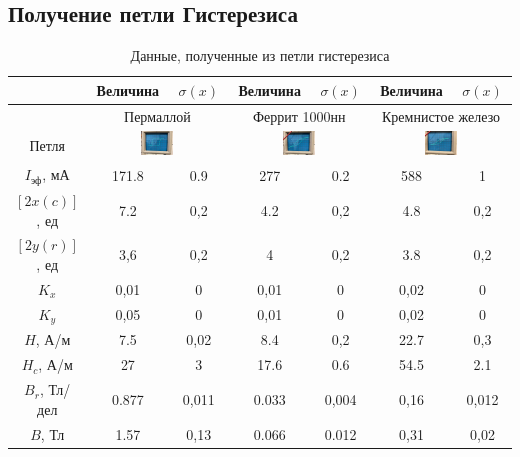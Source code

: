 \documentclass[a4paper, 12pt]{article}%
\begin{document}
	\subsection*{Получение петли Гистерезиса}
	\begin{table}[H]
		\centering
		\begin{tabular}{|c|c|c|c|c|c|c|}
			\hline
			& Величина & $\sigma (x)$ & Величина & $\sigma(x)$ & Величина & $\sigma(x)$ \\ \hline
			& \multicolumn{2}{c|}{Пермаллой} & \multicolumn{2}{c|}{Феррит 1000нн} & \multicolumn{2}{c|}{Кремнистое железо} \\ \hline
			Петля & \multicolumn{2}{c|}{\includegraphics[width = 0.25\textwidth]{пермаллой.jpg}} &  \multicolumn{2}{c|}{\includegraphics[width = 0.25\textwidth]{феррит.jpg}} &  \multicolumn{2}{c|}{\includegraphics[width = 0.25\textwidth]{кремнистое железо.jpg}} \\ \hline
			$I_{\text{эф}}$, мА & 171.8 & 0.9 & 277 & 0.2 & 588 & 1 \\ \hline
			$[2x(c)]$, ед & 7.2 & 0,2 & 4.2 & 0,2 & 4.8 & 0,2 \\ \hline
			$[2y(r)]$, ед & 3,6 & 0,2 & 4 & 0,2 & 3.8 & 0,2 \\ \hline
			$K_x$ & 0,01 & 0 & 0,01 & 0 & 0,02 & 0 \\ \hline
			$K_y$ & 0,05 & 0 & 0,01 & 0 & 0,02 & 0 \\ \hline
			$H$, А/м & 7.5 & 0,02 & 8.4 & 0,2 & 22.7 & 0,3 \\ \hline
			$H_c$, А/м & 27 & 3 & 17.6 & 0.6 & 54.5 & 2.1 \\ \hline
			$B_r$, Тл/дел & 0.877 & 0,011 & 0.033 & 0,004 & 0,16 & 0,012 \\ \hline
			$B$, Тл & 1.57 & 0,13 & 0.066 & 0.012 & 0,31 & 0,02 \\ \hline
		\end{tabular}\\
		\caption{Данные, полученные из петли гистерезиса}
	\end{table}
	
\end{document}
